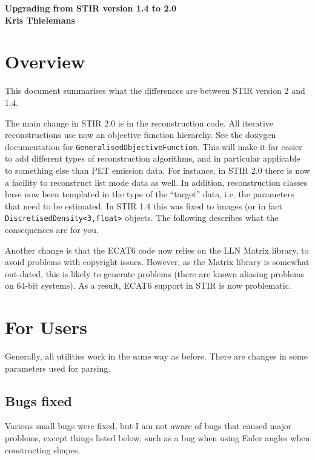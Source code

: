 \documentclass{article}
\begin{document}
\begin{center}
\begin{spacing}{1.5}
\textbf{{\huge Upgrading from STIR version 1.4 to 2.0}}\\
\textbf{Kris Thielemans}
\end{spacing}
\end{center}

\tableofcontents 

\section{Overview}
This document summarises what the differences are
between STIR version 2 and 1.4.

The main change in STIR 2.0 is in the reconstruction code. 
All iterative reconstructions use now an objective function hierarchy. See 
the doxygen documentation for \texttt{GeneralisedObjectiveFunction}. This
will make it far easier to add different types of reconstruction 
algorithms, and in particular applicable to something else than PET
emission data. For instance, in STIR 2.0 there is now a facility to reconstruct
list mode data as well. In addition, reconstruction classes have now been
templated in the type of the ``target'' data, i.e. the parameters that 
need to be estimated. In STIR 1.4 this was fixed to images
(or in fact \texttt{DiscretisedDensity<3,float>} objects. 
The following describes what the consequences are for you.

Another change is that the ECAT6 code now relies on the LLN Matrix library, to avoid
problems with copyright issues. However, as the Matrix library is somewhat out-dated, this
is likely to generate problems (there are known aliasing problems on 64-bit systems). As a result,
ECAT6 support in STIR is now problematic.

\section{For Users}
Generally, all utilities work in the same way as before. There are
changes in some parameters used for parsing.

\subsection{Bugs fixed}
Various small bugs were fixed, but I am not aware of bugs that caused major problems, except
things listed below, such as a bug when using Euler angles when constructing shapes.
\end{document}
